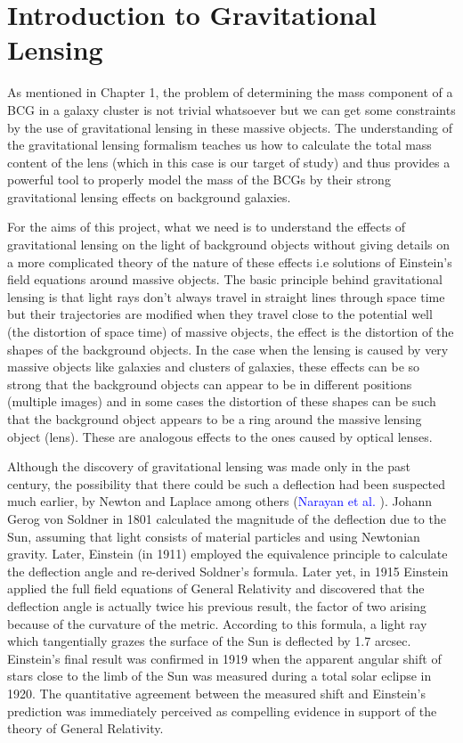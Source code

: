 \chapter{Introduction to Gravitational Lensing}

As mentioned in Chapter 1, the problem of determining the mass component of a BCG in a galaxy cluster is not trivial whatsoever but we can get some constraints by the use of gravitational lensing in these massive objects. The understanding of the gravitational lensing formalism teaches us how to calculate the total mass content of the lens (which in this case is our target of study) and thus provides a powerful tool to properly model the mass of the BCGs by their strong gravitational lensing effects on background galaxies. 

For the aims of this project, what we need is to understand the effects of gravitational lensing on the light of background objects without giving details on a more complicated theory of the nature of these effects i.e solutions of Einstein's field equations around massive objects. The basic principle behind gravitational lensing is that light rays don't always travel in straight lines through space time but their trajectories are modified when they travel close to the potential well (the distortion of space time) of massive objects, the effect is the distortion of the shapes of the background objects. In the case when the lensing is caused by very massive objects like galaxies and clusters of galaxies, these effects can be so strong that the background objects can appear to be in different positions (multiple images) and in some cases the distortion of these shapes can be such that the background object appears to be a ring around the massive lensing object (lens). These are analogous effects to the ones caused by optical lenses. 

Although the discovery of gravitational lensing was made only in the past century, the possibility that there could be such a deflection had been suspected much earlier, by Newton and Laplace among others (\textcolor{blue}{Narayan et al.} \citeyear{Reference25}). Johann Gerog von Soldner in 1801 calculated the magnitude of the deflection due to the Sun, assuming that light consists of material particles and using Newtonian gravity. Later, Einstein (in 1911) employed the equivalence principle to calculate the deflection angle and re-derived Soldner’s formula. Later yet, in 1915 Einstein applied the full field equations of General Relativity and discovered that the deflection angle is actually twice his previous result, the factor of two arising because of the curvature of the metric. According to this formula, a light ray which tangentially grazes the surface of the Sun is deflected by 1.7 arcsec. Einstein’s final result was confirmed in 1919 when the apparent angular shift of stars close to the limb of the Sun was measured during a total solar eclipse in 1920. The quantitative agreement between the measured shift and Einstein’s prediction was immediately perceived as compelling evidence in support of the theory of General Relativity.

